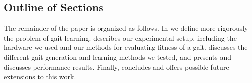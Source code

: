 \subsection{Outline of Sections}

The remainder of the paper is organized as follows. In
 we define more rigorously the problem of
gait learning.  describes our experimental
setup, including the hardware we used and our methods for evaluating
fitness of a gait.  discusses the different gait
generation and learning methods we tested, and 
presents and discusses performance results.  Finally,
 concludes and offers possible future extensions to this
work.
